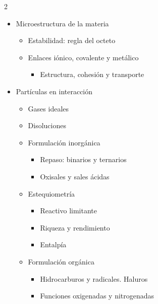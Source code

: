 \documentclass[a4paper,14pt]{extarticle}
\begin{document}
\begin{multicols}{2}
\begin{enumerate}
\begin{itemize}[leftmargin=2mm]
{\begin{itemize}[leftmargin=6mm]
 						
 					\end{itemize}
 					}
 					
 				\item Microestructura de la materia
 					{\footnotesize
 					\begin{itemize}[leftmargin=6mm]
 						\item Estabilidad: regla del octeto 
 						\item Enlaces iónico, covalente y metálico
 						{
 							\begin{itemize}[leftmargin=6mm]
 								\item Estructura, cohesión y transporte		
 							\end{itemize}
 							}
 					\end{itemize}
 					}
 					
 				\item Partículas en interacción
 					{\footnotesize
 					\begin{itemize}[leftmargin=6mm]
 						\item Gases ideales
 						\item Disoluciones
 			
 				
 				    \item Formulación inorgánica
 					  {\footnotesize
 					   \begin{itemize}[leftmargin=6mm]
 						   \item Repaso: binarios y ternarios
 						   \item Oxisales y sales ácidas
 				      	\end{itemize}
 					  }
 				 						
 		        	\item Estequiometría 
 		        	 {\footnotesize
 					   \begin{itemize}[leftmargin=6mm]
 						   \item Reactivo limitante
 						   \item Riqueza y rendimiento
 						   \item Entalpía
 				      	\end{itemize}
 					  }
 		      	
 		      	\item Formulación orgánica{\footnotesize
 				    	\begin{itemize}[leftmargin=6mm]
 						  \item Hidrocarburos y radicales. Haluros
 						  \item Funciones oxigenadas y nitrogenadas
 					  \end{itemize}
 					    }
 					\end{itemize}
 					}
 			\end{itemize}
 

\end{enumerate}
\end{multicols}
\end{document}
